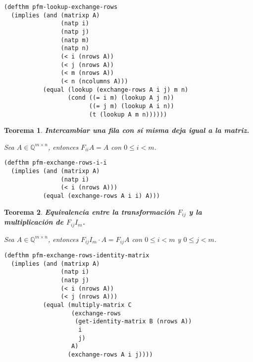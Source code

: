 \documentclass[a4paper,10pt]{article}
\newcommand{\M}[3]{#1 \in \mathbb{Q}^{#2 \times #3}}
\newtheorem{teor}{{Teorema}}
\begin{document}
\begin{lstlisting}[language=clips]
(defthm pfm-lookup-exchange-rows
  (implies (and (matrixp A)
                (natp i)
                (natp j)
                (natp m)
                (natp n)
                (< i (nrows A))
                (< j (nrows A))
                (< m (nrows A))
                (< n (ncolumns A)))
           (equal (lookup (exchange-rows A i j) m n)
                  (cond ((= i m) (lookup A j n))
                        ((= j m) (lookup A i n))
                        (t (lookup A m n))))))
\end{lstlisting}

\par \vspace{16pt}

\begin{teor} \textbf{Intercambiar una fila con sí misma deja igual a la matriz.}\vspace{8pt}\par
Sea $\M{A}{m}{n}$, entonces $F_{ii}A = A$ con $0 \leq i < m$.
\end{teor}

\begin{lstlisting}[language=clips]
(defthm pfm-exchange-rows-i-i
  (implies (and (matrixp A)
                (natp i)
                (< i (nrows A)))
           (equal (exchange-rows A i i) A)))
\end{lstlisting}

\par \vspace{16pt}

\begin{teor} \textbf{Equivalencia entre la transformación $F_{ij}$ y la multiplicación de $F_{ij}I_m$.}\vspace{8pt}\par
Sea $\M{A}{m}{n}$, entonces $F_{ij}I_m \cdot A = F_{ij}A$ con $0 \leq i < m$ y $0 \leq j < m$.
\end{teor}

\begin{lstlisting}[language=clips]
(defthm pfm-exchange-rows-identity-matrix
  (implies (and (matrixp A)
                (natp i)
                (natp j)
                (< i (nrows A))
                (< j (nrows A)))
           (equal (multiply-matrix C
                   (exchange-rows 
                    (get-identity-matrix B (nrows A)) 
                     i 
                     j) 
                   A)
                  (exchange-rows A i j))))
\end{lstlisting}
 
\end{document}
